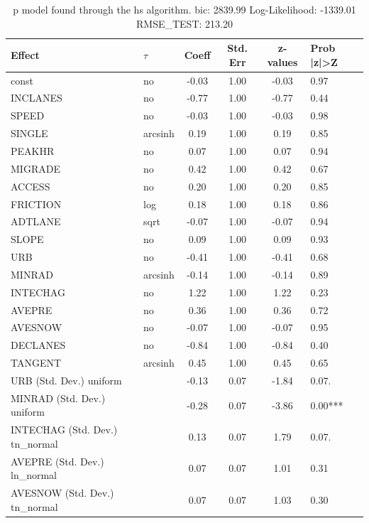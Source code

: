 \begin{table}
	\caption{p model found through the hs algorithm. bic: 2839.99 Log-Likelihood: -1339.01 RMSE_TEST: 213.20}
	\begin{center}
		\begin{tabular}{|l|l|c|c|c|l|}
			\hline
			Effect & $\tau$ & Coeff & Std. Err & z-values & Prob |z|>Z \\
			\hline
			const & no & -0.03 & 1.00 & -0.03 & 0.97 \\
			\hline
			INCLANES & no & -0.77 & 1.00 & -0.77 & 0.44 \\
			\hline
			SPEED & no & -0.03 & 1.00 & -0.03 & 0.98 \\
			\hline
			SINGLE & arcsinh & 0.19 & 1.00 & 0.19 & 0.85 \\
			\hline
			PEAKHR & no & 0.07 & 1.00 & 0.07 & 0.94 \\
			\hline
			MIGRADE & no & 0.42 & 1.00 & 0.42 & 0.67 \\
			\hline
			ACCESS & no & 0.20 & 1.00 & 0.20 & 0.85 \\
			\hline
			FRICTION & log & 0.18 & 1.00 & 0.18 & 0.86 \\
			\hline
			ADTLANE & sqrt & -0.07 & 1.00 & -0.07 & 0.94 \\
			\hline
			SLOPE & no & 0.09 & 1.00 & 0.09 & 0.93 \\
			\hline
			URB & no & -0.41 & 1.00 & -0.41 & 0.68 \\
			\hline
			MINRAD & arcsinh & -0.14 & 1.00 & -0.14 & 0.89 \\
			\hline
			INTECHAG & no & 1.22 & 1.00 & 1.22 & 0.23 \\
			\hline
			AVEPRE & no & 0.36 & 1.00 & 0.36 & 0.72 \\
			\hline
			AVESNOW & no & -0.07 & 1.00 & -0.07 & 0.95 \\
			\hline
			DECLANES & no & -0.84 & 1.00 & -0.84 & 0.40 \\
			\hline
			TANGENT & arcsinh & 0.45 & 1.00 & 0.45 & 0.65 \\
			\hline
			URB (Std. Dev.) uniform &  & -0.13 & 0.07 & -1.84 & 0.07. \\
			\hline
			MINRAD (Std. Dev.) uniform &  & -0.28 & 0.07 & -3.86 & 0.00*** \\
			\hline
			INTECHAG (Std. Dev.) tn_normal &  & 0.13 & 0.07 & 1.79 & 0.07. \\
			\hline
			AVEPRE (Std. Dev.) ln_normal &  & 0.07 & 0.07 & 1.01 & 0.31 \\
			\hline
			AVESNOW (Std. Dev.) tn_normal &  & 0.07 & 0.07 & 1.03 & 0.30 \\

\end{tabular}
\end{center}
\end{table}
